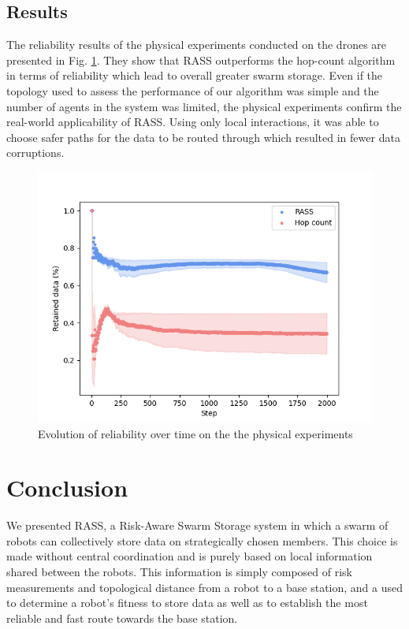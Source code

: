 \subsection{Results}
The reliability results of the physical experiments conducted on the drones are presented in Fig. \ref{results:physicalRelaibility}. They show that \ac{RASS} outperforms the hop-count algorithm in terms of reliability which lead to overall greater swarm storage. Even if the topology used to assess the performance of our algorithm was simple and the number of agents in the system was limited, the physical experiments confirm the real-world applicability of \ac{RASS}. Using only local interactions, it was able to choose safer paths for the data to be routed through which resulted in fewer data corruptions.

\begin{figure}[htbp]
	\centering
    \includegraphics[width=\columnwidth]{figures/dora_mesh/reliability.png}
    \caption[RASS physical reliability]{Evolution of reliability over time on the the physical experiments}
    \label{results:physicalRelaibility}
\end{figure}

\section{Conclusion}
\label{conclusion}

We presented \ac{RASS}, a Risk-Aware Swarm Storage system in which a swarm of robots can collectively store data on strategically chosen members. This choice is made without central coordination and is purely based on local information shared between the robots. This information is simply composed of risk measurements and topological distance from a robot to a base station, and a used to determine a robot's fitness to store data as well as to establish the most reliable and fast route towards the base station.

